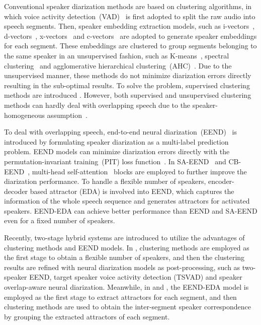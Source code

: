 \documentclass{article}
\begin{document}
Conventional speaker diarization methods are based on clustering algorithms, in which voice activity detection~(VAD)~\cite{SAD} is first adopted to split the raw audio into speech segments. Then, speaker embedding extraction models, such as i-vectors~\cite{ivectors_1}, d-vectors~\cite{dvectors}, x-vectors~\cite{xvectors} and c-vectors~\cite{cvectors} are adopted to generate speaker embeddings for each segment. These embeddings are clustered to group segments belonging to the same speaker in an unsupervised fashion, such as K-means~\cite{kmeans_1}, spectral clustering~\cite{spectral_cluster_2} and agglomerative hierarchical clustering~(AHC)~\cite{ahc_1}. 
Due to the unsupervised manner, these methods do not minimize diarization errors directly resulting in the sub-optimal results. To solve the problem, supervised clustering methods are introduced \cite{LiK0W21,ZhangSWYY22}.
However, both supervised and unsupervised clustering methods can hardly deal with overlapping speech due to the speaker-homogeneous assumption~\cite{overlap_speech_1}. 


To deal with overlapping speech, end-to-end neural diarization~(EEND)~\cite{EEND} is introduced by formulating speaker diarization as a multi-label prediction problem. EEND models can minimize diarization errors directly with the permutation-invariant training~(PIT) loss function~\cite{PIT}. In SA-EEND~\cite{SA_EEND} and CB-EEND~\cite{CB_EEND}, multi-head self-attention~\cite{self_attention_1} blocks are employed to further improve the diarization performance.
To handle a flexible number of speakers, encoder-decoder based attractor (EDA) \cite{EEND_EDA} is involved into EEND, which captures the information of the whole speech sequence and generates attractors for activated speakers. EEND-EDA can achieve better performance than EEND and SA-EEND even for a fixed number of speakers.

Recently, two-stage hybrid systems are introduced to utilize the advantages of clustering methods and EEND models. In \cite{tsvad, EEND-post, EAND}, clustering methods are employed as the first stage to obtain a flexible number of speakers, and then the clustering results are refined with neural diarization models as post-processing, such as two-speaker EEND, target speaker voice activity detection (TSVAD) and speaker overlap-aware neural diarization. Meanwhile, in \cite{EEND-global-local} and \cite{EEND-vector-clust}, the EEND-EDA model is employed as the first stage to extract attractors for each segment, and then clustering methods are used to obtain the inter-segment speaker correspondence by grouping the extracted attractors of each segment.
\end{document}
